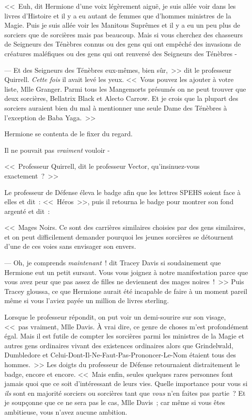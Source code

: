 <<~Euh, dit Hermione d'une voix légèrement aiguë, je suis allée voir dans les livres d'Histoire et il y a eu autant de femmes que d'hommes ministres de la Magie. Puis je suis allée voir les Manitous Suprêmes et il y a eu un peu plus de sorciers que de sorcières mais pas beaucoup. Mais si vous cherchez des chasseurs de Seigneurs des Ténèbres connus ou des gens qui ont empêché des invasions de créatures maléfiques ou des gens qui ont renversé des Seigneurs des Ténèbres -

--- Et des Seigneurs des Ténèbres eux-mêmes, bien sûr,~>> dit le professeur Quirrell. \emph{Cette fois} il avait levé les yeux. <<~Vous pouvez les ajouter à votre liste, Mlle Granger. Parmi tous les Mangemorts présumés on ne peut trouver que deux sorcières, Bellatrix Black et Alecto Carrow. Et je crois que la plupart des sorciers auraient bien du mal à mentionner une seule Dame des Ténèbres à l'exception de Baba Yaga.~>>

Hermione se contenta de le fixer du regard.

Il ne pouvait pas \emph{vraiment} vouloir -

<<~Professeur Quirrell, dit le professeur Vector, qu'insinuez-vous exactement~?~>>

Le professeur de Défense éleva le badge afin que les lettres SPEHS soient face à elles et dit~: <<~Héros~>>, puis il retourna le badge pour montrer son fond argenté et dit~:

<<~Mages Noirs. Ce sont des carrières similaires choisies par des gens similaires, et on peut difficilement demander pourquoi les jeunes sorcières se détournent d'une de ces voies sans envisager son envers.

--- Oh, je comprends \emph{maintenant}~! dit Tracey Davis si soudainement que Hermione eut un petit sursaut. Vous vous joignez à notre manifestation parce que vous avez peur que pas assez de filles ne deviennent des mages noires~!~>> Puis Tracey gloussa, ce que Hermione aurait été incapable de faire à un moment pareil même si vous l'aviez payée un million de livres sterling.

Lorsque le professeur répondit, on put voir un demi-sourire sur son visage, <<~pas vraiment, Mlle Davis. À vrai dire, ce genre de choses m'est profondément égal. Mais il est futile de compter les sorcières parmi les ministres de la Magie et autres gens ordinaires vivant des existences ordinaires alors que Grindelwald, Dumbledore et Celui-Dont-Il-Ne-Faut-Pas-Prononcer-Le-Nom étaient tous des hommes.~>> Les doigts du professeur de Défense retournaient distraitement le badge, encore et encore. <<~Mais enfin, seules quelques rares personnes font jamais quoi que ce soit d'intéressant de leurs vies. Quelle importance pour vous si \emph{ils} sont en majorité sorciers ou sorcières tant que \emph{vous} n'en faites pas partie~? Et je soupçonne que ce ne sera pas le cas, Mlle Davis~; car même si vous êtes ambitieuse, vous n'avez aucune ambition.

